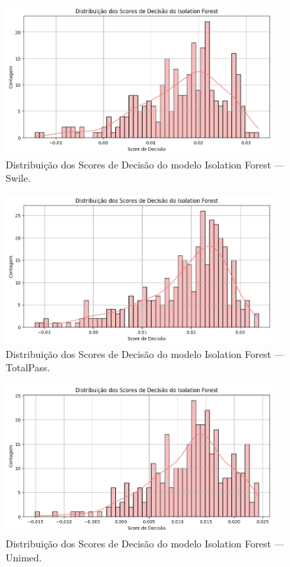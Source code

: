 \begin{figure}[H]
    \centering
    \includegraphics[width=0.9\textwidth]{imagens/swile_iso_forest.png}
    \caption{Distribuição dos Scores de Decisão do modelo Isolation Forest — Swile.}
    \label{fig:swile_iso_forest}
\end{figure}

\begin{figure}[H]
    \centering
    \includegraphics[width=0.9\textwidth]{imagens/totalpass_iso_forest.png}
    \caption{Distribuição dos Scores de Decisão do modelo Isolation Forest — TotalPass.}
    \label{fig:totalpass_iso_forest}
\end{figure}

\begin{figure}[H]
    \centering
    \includegraphics[width=0.9\textwidth]{imagens/unimed_iso_forest.png}
    \caption{Distribuição dos Scores de Decisão do modelo Isolation Forest — Unimed.}
    \label{fig:unimed_iso_forest}
\end{figure}

